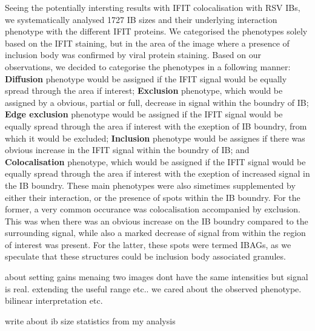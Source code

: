 Seeing the potentially intersting results with IFIT colocalisation with RSV IBs, we systematically analysed 1727 IB sizes and their underlying interaction phenotype with the different IFIT proteins. We categorised the phenotypes solely based on the IFIT staining, but in the area of the image where a presence of inclusion body was confirmed by viral protein staining. Based on our observations, we decided to categorise the phenotypes in a following manner: \textbf{Diffusion} phenotype would be assigned if the IFIT signal would be equally spread through the area if interest; \textbf{Exclusion} phenotype, which would be assigned by a obvious, partial or full, decrease in signal within the boundry of IB; \textbf{Edge exclusion} phenotype would be assigned if the IFIT signal would be equally spread through the area if interest with the exeption of IB boundry, from which it would be excluded; \textbf{Inclusion} phenotype would be assignes if there was obvious increase in the IFIT signal within the boundry of IB; and \textbf{Colocalisation} phenotype, which would be assigned if the IFIT signal would be equally spread through the area if interest with the exeption of increased signal in the IB boundry. These main phenotypes were also simetimes supplemented by either their interaction, or the presence of spots within the IB boundry. For the former, a very common occurance was colocalisation accompanied by exclusion. This was when there was an obvious increase on the IB boundry compared to the surrounding signal, while also a marked decrease of signal from within the region of interest was present. For the latter, these spots were termed IBAGs, as we speculate that these structures could be inclusion body associated granules.

about setting gains menaing two images dont have the same intensities but signal is real. extending the useful range etc..  we cared about the observed phenotype. bilinear interpretation etc.

write about ib size statistics from my analysis

